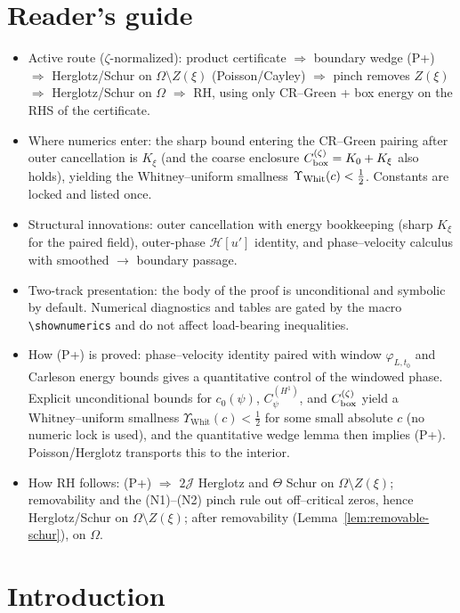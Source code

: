 \documentclass[11pt]{article}
\newcommand{\Hilb}{\mathcal H}
\theoremstyle{definition}
\theoremstyle{remark}
\begin{document}
\section*{Reader's guide}
\begin{itemize}
\item Active route ($\zeta$-normalized): product certificate $\Rightarrow$ boundary wedge (P+) $\Rightarrow$ Herglotz/Schur on $\Omega\setminus Z(\xi)$ (Poisson/Cayley) $\Rightarrow$ pinch removes $Z(\xi)$ $\Rightarrow$ Herglotz/Schur on $\Omega$ $\Rightarrow$ RH, using only CR–Green + box energy on the RHS of the certificate.
\item Where numerics enter: the sharp bound entering the CR–Green pairing after outer cancellation is $K_\xi$ (and the coarse enclosure $C_{\rm box}^{(\zeta)}=K_0+K_\xi$ also holds), yielding the Whitney–uniform smallness $\Upsilon_{\rm Whit}(c)<\tfrac12$. Constants are locked and listed once.
\item Structural innovations: outer cancellation with energy bookkeeping (sharp $K_\xi$ for the paired field), outer-phase $\Hilb[u']$ identity, and phase–velocity calculus with smoothed $\to$ boundary passage.
\item Two-track presentation: the body of the proof is unconditional and symbolic by default. Numerical diagnostics and tables are gated by the macro \verb+\shownumerics+ and do not affect load-bearing inequalities.
\item How (P+) is proved: phase–velocity identity paired with window $\varphi_{L,t_0}$ and Carleson energy bounds gives a quantitative control of the windowed phase. Explicit unconditional bounds for $c_0(\psi)$, $C_\psi^{(H^1)}$, and $C_{\rm box}^{(\zeta)}$ yield a Whitney–uniform smallness $\Upsilon_{\mathrm{Whit}}(c)<\tfrac12$ for some small absolute $c$ (no numeric lock is used), and the quantitative wedge lemma then implies (P+). Poisson/Herglotz transports this to the interior.
\item How RH follows: (P+) $\Rightarrow$ $2\mathcal J$ Herglotz and $\Theta$ Schur on $\Omega\setminus Z(\xi)$; removability and the (N1)–(N2) pinch rule out off–critical zeros, hence Herglotz/Schur on $\Omega\setminus Z(\xi)$; after removability (Lemma~\ref{lem:removable-schur}), on $\Omega$.
\end{itemize}

\section{Introduction}
\end{document}
